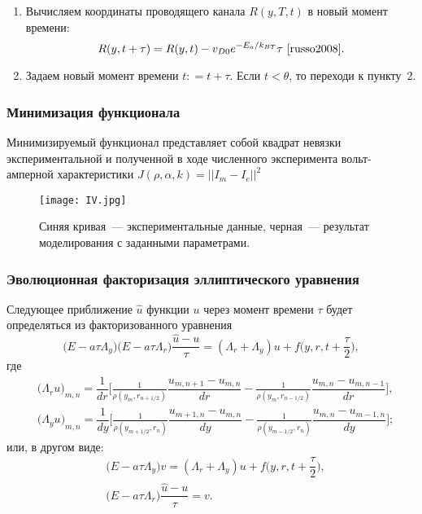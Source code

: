 \documentclass{beamer}
\begin{document}
\begin{frame}[allowframebreaks]
\begin{enumerate}
    \item Вычисляем координаты проводящего канала $R(y,T,t)$ в новый момент времени:
        \begin{equation*}
            R(y,t + \tau) = R(y,t) - v_{D0} e^{-E_a/{k}_{BT}} \tau~\cite{russo2008}.
        \end{equation*}

    \item Задаем новый момент времени $t: = t + \tau$. Если $t < \theta$, то переходи к пункту~2.

    \end{enumerate}
\end{frame}

\begin{frame}
    \frametitle{Минимизация функционала}
    Минимизируемый функционал представляет собой квадрат невязки экспериментальной и полученной в ходе численного эксперимента вольт-амперной характеристики $ J(\rho,\alpha,k) = || I_m - I_e||^2 $
    \begin{figure}
        \texttt{[image: IV.jpg]}
        \caption{Синяя кривая~--- экспериментальные данные, черная~--- результат моделирования с заданными параметрами.}
    \end{figure}
\end{frame}

\begin{frame}
    \frametitle{Эволюционная факторизация эллиптического уравнения}

    Следующее приближение $\hat{u}$ функции $u$ через момент времени $\tau$ будет определяться из  факторизованного уравнения
    \begin{equation*}
        \Big(E - a\tau \Lambda_y\Big)\Big(E - a \tau \Lambda_r\Big)\dfrac{\hat{u} - u}{\tau} = (\Lambda_r + \Lambda_y) u + f\Big(y,r,t+\dfrac{\tau}{2}\Big),
    \end{equation*}
    где
    \begin{align*}
    &{\Big(\Lambda_r u\Big)}_{m,n} = \dfrac{1}{dr}\bigg[\frac{1}{\rho(y_{m},r_{n + 1/2})}\dfrac{u_{m,n + 1} - u_{m,n}}{dr} - \frac{1}{\rho(y_{m},r_{n - 1/2})}\dfrac{u_{m,n} - u_{m,n - 1}}{dr}\bigg], \\
    &{\Big(\Lambda_y u\Big)}_{m,n} = \dfrac{1}{dy}\bigg[\frac{1}{\rho(y_{m + 1/2},r_{n})}\dfrac{u_{m + 1,n} - u_{m,n}}{dy} - \frac{1}{\rho(y_{m - 1/2},r_{n})}\dfrac{u_{m,n} - u_{m - 1,n}}{dy}\bigg];
\end{align*}
или, в другом виде:
\begin{align*}
    &\Big(E - a\tau \Lambda_y\Big)v = (\Lambda_r + \Lambda_y) u + f\Big(y,r,t+\dfrac{\tau}{2}\Big), \\
    &\Big(E - a \tau \Lambda_r\Big)\dfrac{\hat{u} - u}{\tau} = v.
\end{align*}

\end{frame}
\end{document}
